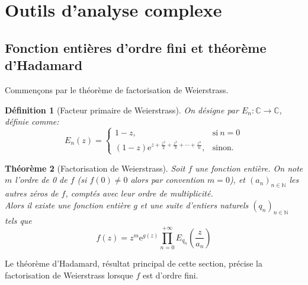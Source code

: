 \documentclass[french]{report}
\newtheorem{theorem}{Théorème}[section]
\newtheorem{definition}[theorem]{Définition}
\begin{document}
\section{Outils d'analyse complexe}

\subsection{Fonction entières d'ordre fini et théorème d'Hadamard}

Commençons par le théorème de factorisation de Weierstrass.

\begin{definition}[Facteur primaire de Weierstrass]
  On désigne par $E_n:\mathbb{C}\to\mathbb{C}$, définie comme:
  \begin{equation*}
    E_n(z)=
    \begin{cases}
      1-z, & \text{si}\ n=0\\
      (1-z)\mathrm{e}^{z+\frac{z^2}{2}+\frac{z^3}{3}+\cdots+\frac{z^n}{n}}, & \text{sinon}.
    \end{cases}
  \end{equation*}
\end{definition}

\begin{theorem}[Factorisation de Weierstrass]\label{thm:factorisation-weierstrass}
  Soit $f$ une fonction entière. On note $m$ l'ordre de 0 de $f$ (si $f(0)\neq 0$ alors par convention $m=0$), et $(a_n)_{n\in\mathbb{N}}$ les autres zéros de $f$, comptés avec leur ordre de multiplicité.
  \\

  Alors il existe une fonction entière $g$ et une suite d'entiers naturels $(q_n)_{n\in\mathbb{N}}$ tels que
  \[
    f(z)=z^m\mathrm{e}^{g(z)}\prod_{n=0}^{+\infty}E_{q_n}\left(\frac{z}{a_n}\right)
  \]
\end{theorem}

Le théorème d'Hadamard, résultat principal de cette section, précise la factorisation de Weierstrass lorsque $f$ est d'ordre fini.
\end{document}

